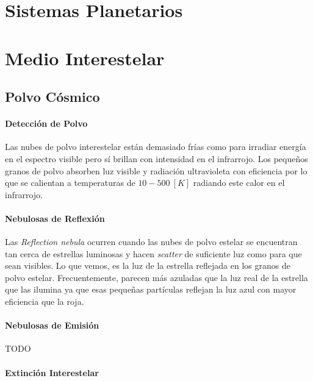 \documentclass{tufte-handout}
\begin{document}
\clearpage

\section{Sistemas Planetarios}

\clearpage

\section{Medio Interestelar}

\subsection{Polvo Cósmico}

\paragraph{Detección de Polvo}

Las nubes de polvo interestelar están demasiado frías como para irradiar energía en el espectro visible pero sí brillan con intensidad en el infrarrojo. Los pequeños granos de polvo absorben luz visible y radiación ultravioleta con eficiencia por lo que se calientan a temperaturas de $10-500~[K]$ radiando este calor en el infrarrojo.

\paragraph{Nebulosas de Reflexión}

Las \emph{Reflection nebula} ocurren cuando las nubes de polvo estelar se encuentran tan cerca de estrellas luminosas y hacen \emph{scatter} de suficiente luz como para que sean visibles. Lo que vemos, es la luz de la estrella reflejada en los granos de polvo estelar. Frecuentemente, parecen más azuladas que la luz real de la estrella que las ilumina ya que esas pequeñas partículas reflejan la luz azul con mayor eficiencia que la roja.

\paragraph{Nebulosas de Emisión}

TODO

\paragraph{Extinción Interestelar}
\end{document}
